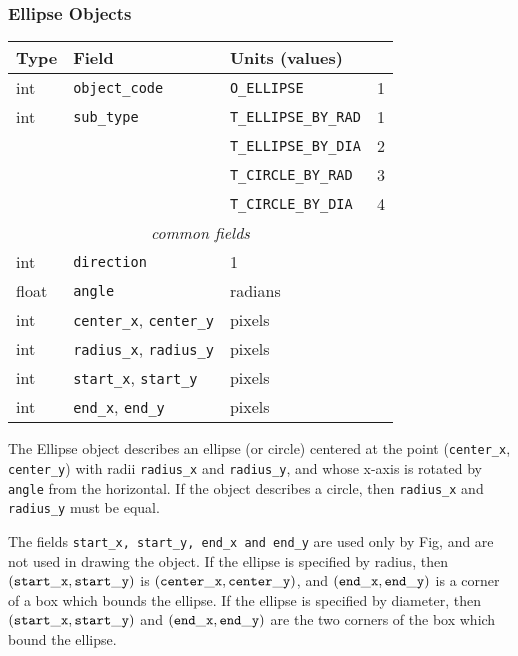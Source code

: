 \subsubsection{Ellipse Objects}
%
\begin{center}
\begin{tabular} {|l|l|ll|}
\hline

Type	& Field			& Units (values)	&	\\ \hline
\hline
%
int	& {\tt object\_code} 	& {\tt O\_ELLIPSE}	&     1	\\ \hline
%
int	& {\tt sub\_type}	& {\tt T\_ELLIPSE\_BY\_RAD} & 1	\\
	&			& {\tt T\_ELLIPSE\_BY\_DIA} & 2	\\
	&			& {\tt T\_CIRCLE\_BY\_RAD} &  3	\\
	&			& {\tt T\_CIRCLE\_BY\_DIA} &  4	\\ \hline
%
\multicolumn{4}{c}{\it common fields}				\\ \hline
%
int	& {\tt direction}	& 1			&	\\ \hline
%
float	& {\tt angle}		& radians		&	\\ \hline
%
int	& {\tt center\_x},
	  {\tt center\_y}	& pixels		&	\\ \hline
%
int	& {\tt radius\_x},
	  {\tt radius\_y}	& pixels		&	\\ \hline
%
int	& {\tt start\_x},
	  {\tt start\_y}	& pixels		&	\\ \hline
%
int	& {\tt end\_x},
	  {\tt end\_y}		& pixels		&	\\ \hline
\end{tabular}
\end{center}
%
The Ellipse object describes an ellipse (or circle) centered at the point
	\linebreak ({\tt center\_x}, {\tt center\_y})
	with radii {\tt radius\_x} and {\tt radius\_y}, and whose x-axis
	is rotated by {\tt angle} from the horizontal.
If the object describes a circle, then {\tt radius\_x} and {\tt radius\_y}
	must be equal.

The fields {\tt start\_x, start\_y, end\_x and end\_y} are used only by
	Fig, and are not used in drawing the object.
If the ellipse is specified by radius, then $({\tt start\_x}, {\tt start\_y})$
	is $({\tt center\_x}, {\tt center\_y})$,
	and $({\tt end\_x}, {\tt end\_y})$ is a corner of a box which
	bounds the ellipse.
If the ellipse is specified by diameter, then $({\tt start\_x}, {\tt start\_y})$
	and $({\tt end\_x}, {\tt end\_y})$ are the two corners of the box
	which bound the ellipse.

